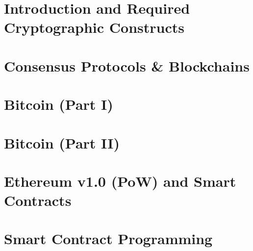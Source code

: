 \documentclass[a4paper,12pt,openany]{article}
\begin{document}
\section{Introduction and Required Cryptographic Constructs}\label{sec:intro}

\newpage

\section{Consensus Protocols \& Blockchains}\label{sec:consensus-protocols-blockchains}

\newpage

\section{Bitcoin (Part I)}\label{chapter-3-bitcoin-part-1}

\newpage

\section{Bitcoin (Part II)}\label{chapter-3-bitcoin-part-2}

\newpage

\section{Ethereum v1.0 (PoW) and Smart Contracts}\label{chapter-4-Eth1}

\newpage

\section{Smart Contract Programming}\label{chapter-6-smart-contract-programming}







\clearpage








\end{document}
